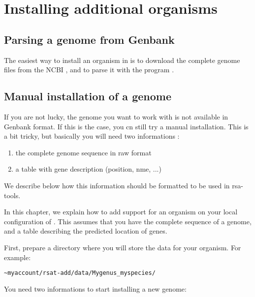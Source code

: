
\section{Installing additional organisms}

\subsection{Parsing a genome from Genbank}

The easiest way to install an organism in \RSAT is to download the
complete genome files from the NCBI
, and to parse it with the
program .




\subsection{Manual installation of a genome}

If you are not lucky, the genome you want to work with is not
available in Genbank format. If this is the case, you cn still try a
manual installation. This is a bit tricky, but basically you will need
two informations :

\begin{enumerate}
\item the complete genome sequence in raw format
\item a table with gene description (position, nme, ...)
\end{enumerate}

We describe below how this information should be formatted to be used
in rsa-tools.

In this chapter, we explain how to add support for an organism on your
local configuration of \RSAT. This assumes that you have the complete
sequence of a genome, and a table describing the predicted location of
genes.

First, prepare a directory where you will store the data for your
organism. For example:

\begin{verbatim}
~myaccount/rsat-add/data/Mygenus_myspecies/
\end{verbatim}

You need two informations to start installing a new genome:

